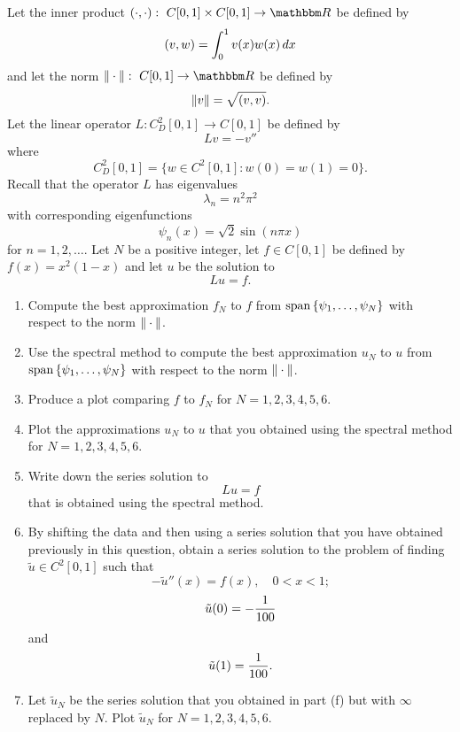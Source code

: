 Let the inner product $\ip{\cdot,\cdot}:\mbox{ }C[0,1]\times C[0,1]\rightarrow\R$ be defined by
\[
(v,w)=\int_0^1v(x)w(x)\,dx
\]
and let the norm $\norm{\cdot}:\mbox{ }C[0,1]\rightarrow\R$ be defined by
\[
\|v\|=\sqrt{(v,v)}.
\]
Let the linear operator $L: C^2_D[0,1]\to C[0,1]$ be defined by
\[
L v = -v''
\]
where
\[
C^2_D[0,1] = \{ w \in C^2[0,1] : w(0) = w(1) = 0\}.
\]
Recall that the operator $L$ has eigenvalues
\[
\lambda_n = n^2 \pi^2
\]
with corresponding eigenfunctions
\[
\psi_n(x) = \sqrt{2} \sin(n \pi x)
\]
for $n=1,2,\ldots$. Let $N$ be a positive integer, let $f\in C[0,1]$ be defined by $f(x) = x^2(1-x)$ and let $u$ be the solution to
\[
Lu=f.
\]

\begin{enumerate}
\item Compute the best approximation $f_N$ to $f$ from ${\rm span}\left\{\psi_1,\ldots,\psi_N\right\}$ with respect to the norm $\|\cdot\|$.
\\
\item Use the spectral method to compute the best approximation $u_N$ to $u$ from ${\rm span}\left\{\psi_1,\ldots,\psi_N\right\}$ with respect to the norm $\|\cdot\|$.
\\
\item Produce a plot comparing $f$ to $f_N$ for $N=1,2,3,4,5,6$.
\\
\item Plot the approximations $u_N$ to $u$ that you obtained using the spectral method for $N=1,2,3,4,5,6$.
\\
\item Write down the series solution to
\[
Lu=f
\]
that is obtained using the spectral method.
\\
\item By shifting the data and then using a series solution that you have obtained previously in this question, obtain a series solution to the problem of finding $\tilde{u}\in C^2[0,1]$ such that
\[
-\tilde{u}''(x)=f(x),\quad 0<x<1;
\]
\[
\tilde{u}(0) = -{1\over 100}
\]
and
\[
\tilde{u}(1) = {1\over 100}.
\]
\item Let $\tilde{u}_N$ be the series solution that you obtained in part (f) but with $\infty$ replaced by $N$. Plot $\tilde{u}_N$ for $N=1,2,3,4,5,6$.
\end{enumerate}

           


